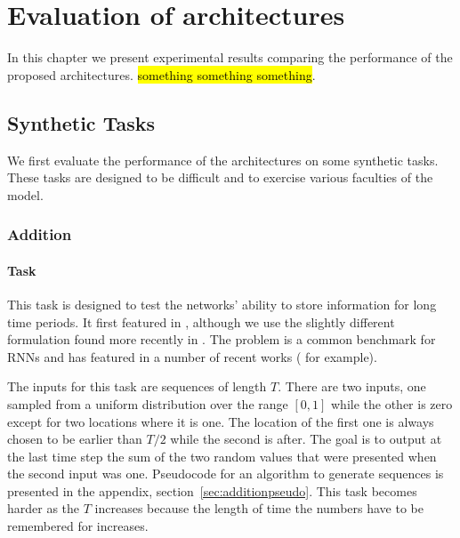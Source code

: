 
\chapter{Evaluation of architectures}\label{C:exps}
In this chapter we present experimental results comparing the performance of the proposed architectures.
\hl{something something something}.

\section{Synthetic Tasks}
We first evaluate the performance of the architectures on some synthetic tasks. These tasks are designed
to be difficult and to exercise various faculties of the model.

\subsection{Addition}
\subsubsection{Task}
This task is designed to test the networks' ability to store information for long time periods. It first
featured in \autocite{Hochreiter1997}, although we use the slightly different formulation found more 
recently in \autocite{Le2015}. The problem is a common benchmark for RNNs and has featured in a number of
recent works (\autocite{Arjovsky2015, Henaff2016, Barone2016, Neyshabur2016} for example).

The inputs for this task are sequences of length \(T\). There are two inputs, one sampled from a uniform
distribution over the range \([0,1]\) while the other is zero except for two locations where it is one.
The location of the first one is always chosen to be earlier than \(T/2\) while the second is after.
The goal is to output at the last time step the sum of the two random values that were presented when the
second input was one. Pseudocode for an algorithm to generate sequences is presented in the appendix,
section~\ref{sec:additionpseudo}.
This task becomes harder as the \(T\) increases because the length of time the numbers have to
be remembered for increases.


